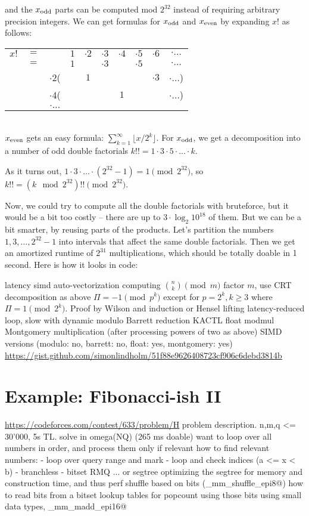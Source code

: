 \documentclass[openany]{book}
\begin{document}
and the $x_\text{odd}$ parts can be computed mod $2^{32}$ instead of requiring arbitrary precision integers. We can get formulas for $x_\text{odd}$ and $x_\text{even}$ by expanding $x!$ as follows: \\
\begin{tabular}{cccccccccc}
$x!$&$=$&          &$1$& $\cdot 2$ &$\cdot 3$ &$\cdot 4$ &$\cdot 5$ & $\cdot 6$ & $\cdot \ldots$ \\
    &$=$&          &$1$&           &$\cdot 3$ &          &$\cdot 5$ &           & $\cdot \ldots$ \\
    &   &$\cdot 2$(&   & $1$       &          &          &          & $\cdot 3$ & $\cdot \ldots$)\\
    &   &$\cdot 4$(&   &           &          &  $1$     &          &           & $\cdot \ldots$)\\
    &   &$\cdot \ldots$ &
\end{tabular}
\\
$x_\text{even}$ gets an easy formula: $\sum_{k=1}^\infty \lfloor x / 2^k \rfloor$.
For $x_\text{odd}$, we get a decomposition into a number of odd double factorials $k!! = 1 \cdot 3 \cdot 5 \cdot \ldots \cdot k$.

As it turns out, $1 \cdot 3 \cdot \ldots \cdot (2^{32}-1) = 1 \pmod{2^{32}}$, so $k!! = (k \mod 2^{32})!! \pmod{2^{32}}$.

Now, we could try to compute all the double factorials with bruteforce, but it would be a bit too costly -- there are up to $3 \cdot \log_2{10^{18}}$ of them. But we can be a bit smarter, by reusing parts of the products. Let's partition the numbers $1, 3, \dots, 2^{32}-1$ into intervals that affect the same double factorials. Then we get an amortized runtime of $2^{31}$ multiplications, which should be totally doable in 1 second. Here is how it looks in code:



latency
simd
auto-vectorization
computing $\binom{n}{k} \pmod m$
factor $m$, use CRT
decomposition as above
$\Pi = -1 \pmod{p^k}$ except for $p = 2^k, k \ge 3$ where $\Pi = 1 \pmod{2^k}$. Proof by Wilson and induction or Hensel lifting
latency-reduced loop, slow with dynamic modulo
Barrett reduction
KACTL float modmul
Montgomery multiplication (after processing powers of two as above)
SIMD versions (modulo: no, barrett: no, float: yes, montgomery: yes)
\url{https://gist.github.com/simonlindholm/51f88e9626408723cf906c6debd3814b}

\chapter{Example: Fibonacci-ish II}
\url{https://codeforces.com/contest/633/problem/H}
problem description. n,m,q <= 30'000, 5s TL. solve in omega(NQ) (265 ms doable)
want to loop over all numbers in order, and process them only if relevant
how to find relevant numbers:
- loop over query range and mark
- loop and check indices (a <= x < b)
- branchless
- bitset RMQ ... or segtree
optimizing the segtree for memory and construction time, and thus perf
shuffle based on bits (\verb@_mm_shuffle_epi8@)
how to read bits from a bitset
lookup tables for popcount using those bits
using small data types, \verb@_mm_madd_epi16@
\end{document}
